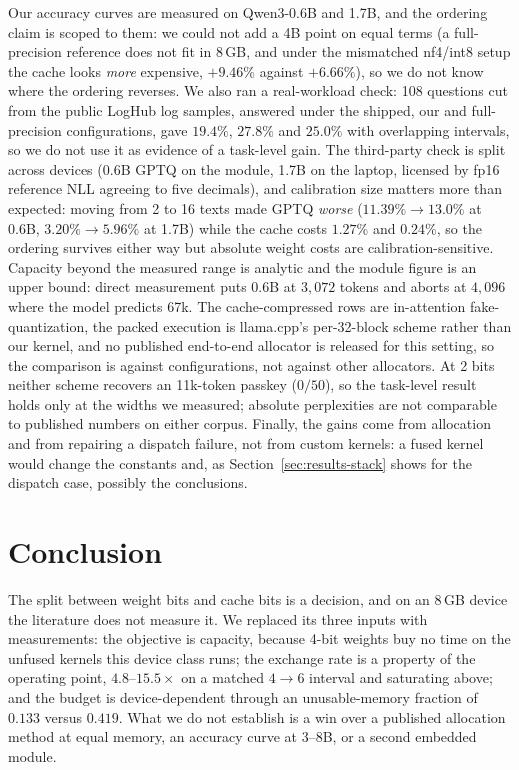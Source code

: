 \documentclass[10pt,journal]{IEEEtran}
\begin{document}
Our accuracy curves are measured on Qwen3-0.6B and 1.7B, and the ordering
claim is scoped to them: we could not add a 4B point on equal terms (a
full-precision reference does not fit in 8\,GB, and under the mismatched
nf4/int8 setup the cache looks \emph{more} expensive, $+9.46\%$ against
$+6.66\%$), so we do not know where the ordering reverses. We also ran a real-workload check: 108 questions cut from the public LogHub log samples, answered under the shipped, our and full-precision configurations, gave $19.4\%$, $27.8\%$ and $25.0\%$ with overlapping intervals, so we do not use it as evidence of a task-level gain. The third-party
check is split across devices (0.6B GPTQ on the module, 1.7B on the laptop,
licensed by fp16 reference NLL agreeing to five decimals), and calibration size
matters more than expected: moving from 2 to 16 texts made GPTQ \emph{worse}
($11.39\%\to13.0\%$ at 0.6B, $3.20\%\to5.96\%$ at 1.7B) while the cache costs
$1.27\%$ and $0.24\%$, so the ordering survives either way but absolute weight
costs are calibration-sensitive. Capacity beyond the measured range is
analytic and the module figure is an upper bound: direct measurement puts 0.6B
at $3{,}072$ tokens and aborts at $4{,}096$ where the model predicts 67k. The
cache-compressed rows are in-attention fake-quantization, the packed execution
is llama.cpp's per-32-block scheme rather than our kernel, and no published
end-to-end allocator is released for this setting, so the comparison is against
configurations, not against other allocators. At 2 bits neither scheme recovers
an 11k-token passkey ($0/50$), so the task-level result holds only at the widths
we measured; absolute perplexities are not comparable to published numbers on
either corpus. Finally, the gains come from allocation and from repairing a
dispatch failure, not from custom kernels: a fused kernel would change the
constants and, as Section~\ref{sec:results-stack} shows for the dispatch case,
possibly the conclusions.

\section{Conclusion}

The split between weight bits and cache bits is a decision, and on an 8\,GB
device the literature does not measure it. We replaced its three inputs with
measurements: the objective is capacity, because 4-bit weights buy no time on the
unfused kernels this device class runs; the exchange rate is a property of the
operating point, $4.8$--$15.5\times$ on a matched $4{\to}6$ interval
and saturating above; and the budget is
device-dependent through an
unusable-memory fraction of $0.133$ versus $0.419$. What we do not establish is a
win over a published allocation method at equal memory, an accuracy curve at
3--8B, or a second embedded module.
\end{document}
